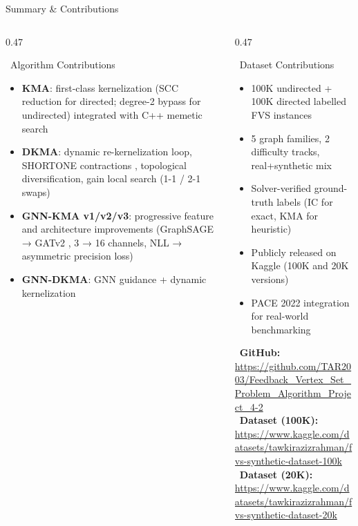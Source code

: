\documentclass[aspectratio=169]{beamer}
\newcommand{\highlight}[1]{\textcolor{midblue}{\textbf{#1}}}
\renewcommand{\footnotesize}{\tiny}
\begin{document}
\begin{frame}{Summary \& Contributions}
	\tiny
	\begin{columns}[T]
		\begin{column}{0.47\textwidth}
			\begin{block}{\faCode~Algorithm Contributions}
				\begin{itemize}\setlength\itemsep{2pt}
					\item \highlight{KMA}: first-class kernelization (SCC reduction
					      for directed; degree-2 bypass for undirected) integrated
					      with C++ memetic search
					\item \highlight{DKMA}: dynamic re-kernelization loop,
					      SHORTONE contractions \cite{langedal2022},
					      topological diversification,
					      gain local search (1-1 / 2-1 swaps)
					\item \highlight{GNN-KMA v1/v2/v3}: progressive feature and
					      architecture improvements (GraphSAGE → GATv2 \cite{brody2022},
					      3 → 16 channels, NLL → asymmetric precision loss)
					\item \highlight{GNN-DKMA}: GNN guidance + dynamic kernelization
				\end{itemize}
			\end{block}
		\end{column}
		\begin{column}{0.47\textwidth}
			\begin{block}{\faDatabase~Dataset Contributions}
				\begin{itemize}\setlength\itemsep{2pt}
					\item 100K undirected + 100K directed labelled FVS instances
					\item 5 graph families, 2 difficulty tracks, real+synthetic mix
					\item Solver-verified ground-truth labels (IC for exact,
					      KMA for heuristic)
					\item Publicly released on Kaggle (100K and 20K versions)
					\item PACE 2022 integration for real-world benchmarking
				\end{itemize}
			\end{block}
			\vspace{4pt}
			\begin{tcolorbox}[greenbox,fontupper=\footnotesize]
				\faGithub~\textbf{GitHub:}\\
				{\tiny\url{https://github.com/TAR2003/Feedback_Vertex_Set_Problem_Algorithm_Project_4-2}}\\[4pt]
				\faDatabase~\textbf{Dataset (100K):}\\
				{\tiny\url{https://www.kaggle.com/datasets/tawkirazizrahman/fvs-synthetic-dataset-100k}}\\[2pt]
				\faDatabase~\textbf{Dataset (20K):}\\
				{\tiny\url{https://www.kaggle.com/datasets/tawkirazizrahman/fvs-synthetic-dataset-20k}}
			\end{tcolorbox}
		\end{column}
	\end{columns}
\end{frame}
\end{document}
